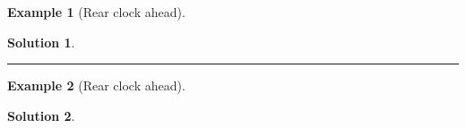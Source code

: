 \documentclass{article}
\newtheorem*{example}{Example}
\newtheorem*{solution}{Solution}
\newlength\outerlinewidth
\newlength\interline
\newlength\hangleft
\newenvironment{block}{%
		\trivlist\item\relax\par%
		\noindent\rlap{%
			\hspace*{-\hangleft}\color{gray}%
			\rule{\dimexpr \hangleft+\linewidth\relax}{\outerlinewidth}%
		}%
	}{%
		\par%
		\noindent\rlap{%
			\hspace*{-\hangleft}\color{gray}%
			\rule{\dimexpr \hangleft+\linewidth\relax}{\outerlinewidth}
		}%
		\endtrivlist%
	}
\newcommand*\blockline{%
		\par\noindent%
		\begingroup\color{gray}%
		\rule{\linewidth\relax}{\interline}\endgroup\par%
	}
\begin{document}
\begin{block}
	\begin{example}[Rear clock ahead]
		\lipsum[1]
	\end{example}
	\begin{solution}
		\lipsum[2]
	\end{solution}
	\blockline
	\begin{example}[Rear clock ahead]
		\lipsum[1]
	\end{example}
	\begin{solution}
		\lipsum[5è]
	\end{solution}
\end{block}
\end{document}
